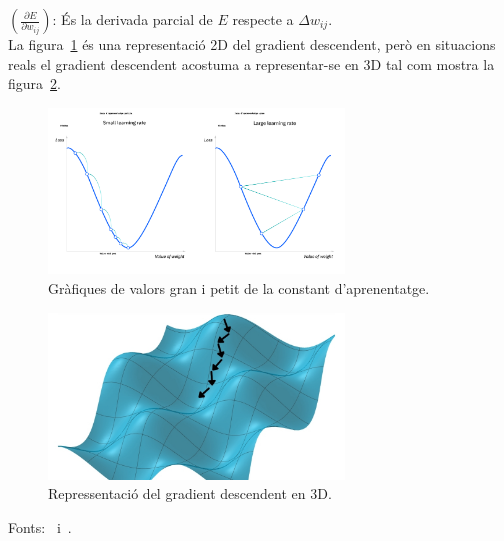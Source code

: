            $\left( \frac{\partial E}{\partial w_{ij}} \right)$: És la derivada parcial de $E$ respecte a $\Delta w_{ij}$. \\

           La figura~\ref{Gran i petit} és una representació 2D del gradient descendent, però en situacions reals el gradient descendent acostuma a representar-se en 3D tal com mostra la figura~\ref{f:gradient3D}.

    \begin{figure}[H]
    \centering
    \includegraphics[width=0.7\textwidth]{./figures/constant_gradient.png}
        \caption{Gràfiques de valors gran i petit de la constant d'aprenentatge.~\cite{Img_granpetit}}
        \label{Gran i petit}
    \end{figure}

    \begin{figure}[H]
    \centering
    \includegraphics[width=0.7\textwidth]{./figures/gradient_descendent3d.png}
    \caption{Repressentació del gradient descendent en 3D.~\cite{Img_3d}}
    \label{f:gradient3D}
    \end{figure}


\bigskip

Fonts:~\cite{IBM_Gradient} i~\cite{Video_Gradient}.


